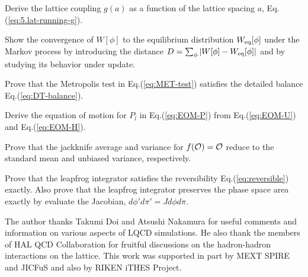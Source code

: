 \begin{prob}\label{prob:8}
Derive the lattice coupling $g(a)$ as a function of the lattice spacing $a$, Eq.(\ref{eq:5.lat-running-g}).
\end{prob}

\begin{prob}\label{prob:9}
Show the convergence of $W[\phi]$ to the equilibrium distribution $W_{\rm eq}[\phi]$
under the Markov process by introducing the distance $D= \sum_{\phi} \left| W[\phi] -W_{\rm eq}[\phi] \right| $
 and by studying its behavior under update.
\end{prob}

\begin{prob}\label{prob:10}
Prove that the Metropolis test in Eq.(\ref{eq:MET-test})
satisfies the detailed balance Eq.(\ref{eq:DT-balance}).
\end{prob}

\begin{prob}\label{prob:11}
Derive the equation of motion for $P_l$ in Eq.(\ref{eq:EOM-P})
from Eq.(\ref{eq:EOM-U}) and  Eq.(\ref{eq:EOM-H}).
\end{prob}

\begin{prob}\label{prob:12}
Prove that the jackknife average and variance for $f({\cal O})={\cal O}$ reduce to the 
standard mean and unbiased variance, respectively.
\end{prob}

\begin{prob}\label{prob:13}
Prove that  the leapfrog integrator satisfies the reversibility Eq.(\ref{eq:reversible}) exactly.
Also prove that  the leapfrog integrator preserves the phase space area exactly by
evaluate the Jacobian, $d\phi' d\pi'= J d\phi d\pi $. 
\end{prob}
 

\begin{acknowledgement}
The author thanks Takumi Doi and Atsushi Nakamura for useful comments and information on various aspects of
LQCD simulations.
He also thank the members of HAL QCD Collaboration for  fruitful discussions on the hadron-hadron interactions 
on the lattice.
This work was supported in part by MEXT SPIRE and JICFuS and also by RIKEN iTHES Project.
\end{acknowledgement}
%

